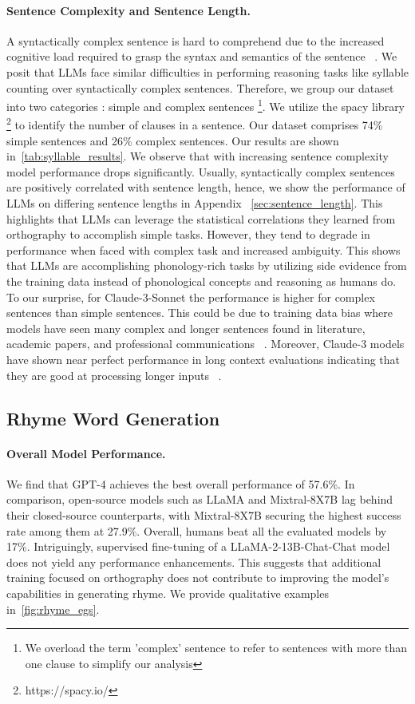 \paragraph{Sentence Complexity and Sentence Length.} A syntactically complex sentence is hard to comprehend due to the increased cognitive load required to grasp the syntax and semantics of the sentence ~\citep{mikk2008sentence}. We posit that LLMs face similar difficulties in performing reasoning tasks like syllable counting over syntactically complex sentences. Therefore, we group our dataset into two categories : simple and complex sentences \footnote{We overload the term 'complex' sentence to refer to sentences with more than one clause to simplify our analysis}. We utilize the spacy library \footnote{https://spacy.io/} to identify the number of clauses in a sentence. Our dataset comprises 74\% simple sentences and 26\% complex sentences. Our results are shown in~\autoref{tab:syllable_results}. We observe that with increasing sentence complexity model performance drops significantly. Usually, syntactically complex sentences are positively correlated with sentence length, hence, we show the performance of LLMs on differing sentence lengths in Appendix ~\ref{sec:sentence_length}. This highlights that LLMs can leverage the statistical correlations they learned from orthography to accomplish simple tasks. However, they tend to degrade in performance when faced with complex task and increased ambiguity. This shows that LLMs are accomplishing phonology-rich tasks by utilizing side evidence from the training data instead of phonological concepts and reasoning as humans do. To our surprise, for Claude-3-Sonnet the performance is higher for complex sentences than simple sentences. This could be due to training data bias where models have seen many complex and longer sentences found in literature, academic papers, and professional communications ~\citep{elazar2024whats}. Moreover, Claude-3 models have shown near perfect performance in long context evaluations indicating that they are good at processing longer inputs ~\citep{claude}. 

\subsection{Rhyme Word Generation}
\paragraph{Overall Model Performance.} We find that GPT-4 achieves the best overall performance of 57.6\%. In comparison, open-source models such as LLaMA and Mixtral-8X7B lag behind their closed-source counterparts, with Mixtral-8X7B securing the highest success rate among them at 27.9\%. Overall, humans beat all the evaluated models by 17\%. Intriguingly, supervised fine-tuning of a LLaMA-2-13B-Chat-Chat model does not yield any performance enhancements. This suggests that additional training focused on orthography does not contribute to improving the model's capabilities in generating rhyme. We provide qualitative examples in~\autoref{fig:rhyme_egs}.

